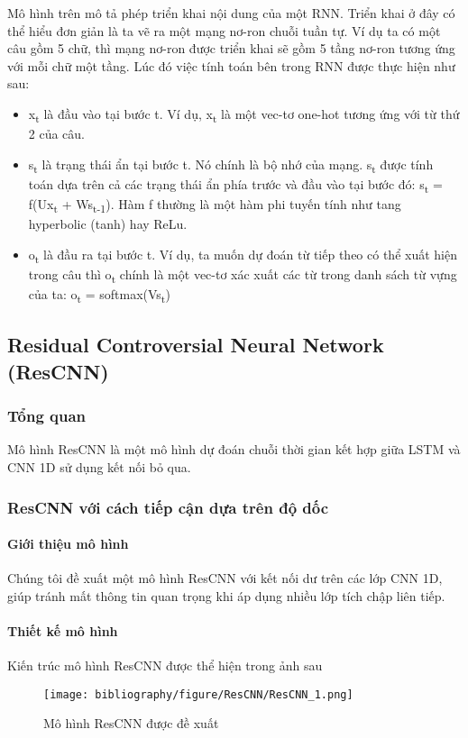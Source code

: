 \documentclass[conference]{IEEEtran}
\begin{document}
Mô hình trên mô tả phép triển khai nội dung của một RNN. Triển khai ở đây có thể hiểu đơn giản là ta vẽ ra một mạng nơ-ron chuỗi tuần tự. Ví dụ ta có một câu gồm 5 chữ, thì mạng nơ-ron được triển khai sẽ gồm 5 tầng nơ-ron tương ứng với mỗi chữ một tầng. Lúc đó việc tính toán bên trong RNN được thực hiện như sau:
\begin{itemize}
    \item x\textsubscript{t} là đầu vào tại bước t. Ví dụ, x\textsubscript{t} là một vec-tơ one-hot tương ứng với từ thứ 2 của câu.
    \item s\textsubscript{t} là trạng thái ẩn tại bước t. Nó chính là bộ nhớ của mạng. s\textsubscript{t} được tính toán dựa trên cả các trạng thái ẩn phía trước và đầu vào tại bước đó: s\textsubscript{t} = f(Ux\textsubscript{t} +  Ws\textsubscript{t-1}). Hàm f thường là một hàm phi tuyến tính như tang hyperbolic (tanh) hay ReLu.
    \item o\textsubscript{t} là đầu ra tại bước t. Ví dụ, ta muốn dự đoán từ tiếp theo có thể xuất hiện trong câu thì o\textsubscript{t} chính là một vec-tơ xác xuất các từ trong danh sách từ vựng của ta: o\textsubscript{t} = softmax(Vs\textsubscript{t})
\end{itemize}


\subsection{Residual Controversial Neural Network (ResCNN)}
\subsubsection{Tổng quan}
Mô hình ResCNN là một mô hình dự đoán chuỗi thời gian kết hợp giữa LSTM và CNN 1D sử dụng kết nối bỏ qua.

\subsubsection{ResCNN với cách tiếp cận dựa trên độ dốc}
\paragraph{Giới thiệu mô hình}
Chúng tôi đề xuất một mô hình ResCNN với kết nối dư trên các lớp CNN 1D, giúp tránh mất thông tin quan trọng khi áp dụng nhiều lớp tích chập liên tiếp.

\paragraph{Thiết kế mô hình} Kiến trúc mô hình ResCNN được thể hiện trong ảnh sau
\begin{figure}[H]
    \centering
    \begin{minipage}{0.43\textwidth}
        \centering
        \texttt{[image: bibliography/figure/ResCNN/ResCNN\_1.png]}
        \caption{Mô hình ResCNN được đề xuất}
        \label{fig:gru_del_up}
    \end{minipage}
\end{figure}
\end{document}
